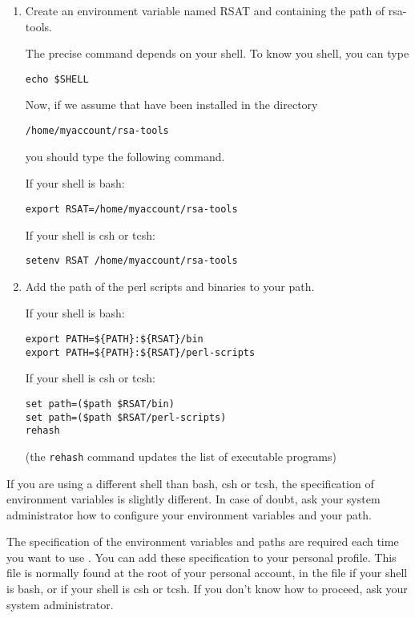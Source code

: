 \documentclass{article}
\begin{document}
\begin{enumerate}

\item Create an environment variable named RSAT and containing the
  path of rsa-tools. 

The precise command depends on your shell. To know you shell, you can
type
\begin{verbatim}
echo $SHELL
\end{verbatim}

Now, if we assume that \RSAT have been installed in the directory

\begin{verbatim}
/home/myaccount/rsa-tools
\end{verbatim}

you should type the following command.

If your shell is bash:
\begin{verbatim}
export RSAT=/home/myaccount/rsa-tools
\end{verbatim}

If your shell is csh or tcsh:
\begin{verbatim}
setenv RSAT /home/myaccount/rsa-tools
\end{verbatim}



\item Add the path of the \RSAT perl scripts and binaries to your
  path.

If your shell is bash:
\begin{verbatim}
export PATH=${PATH}:${RSAT}/bin
export PATH=${PATH}:${RSAT}/perl-scripts
\end{verbatim}

If your shell is csh or tcsh:
\begin{verbatim}
set path=($path $RSAT/bin)
set path=($path $RSAT/perl-scripts)
rehash
\end{verbatim}

(the \texttt{rehash} command updates the list of executable programs)

\end{enumerate}

If you are using a different shell than bash, csh or tcsh, the
specification of environment variables is slightly different.  In case
of doubt, ask your system administrator how to configure your
environment variables and your path.

The specification of the environment variables and paths are required
each time you want to use \RSAT. You can add these specification to
your personal profile.  This file is normally found at the root of
your personal account, in the file  if your shell is
bash, or  if your shell is csh or tcsh. If you don't know
how to proceed, ask your system administrator.
\end{document}
